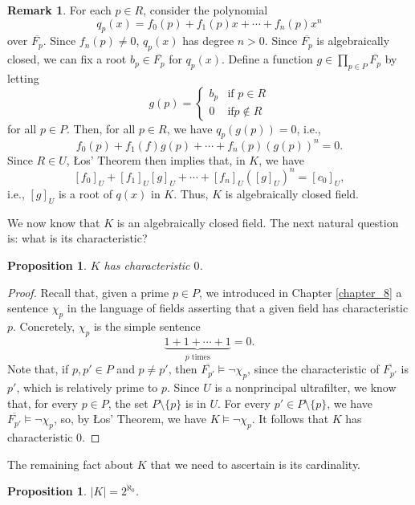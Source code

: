 \documentclass[a4paper]{memoir}
\newtheorem{proposition}[theorem]{Proposition}
\theoremstyle{definition}
\newtheorem{remark}[theorem]{Remark}
\begin{document}
\begin{remark}
  For each $p \in R$, consider the polynomial
  \[
    q_p(x) = f_0(p) + f_1(p) x + \cdots + f_n(p) x^n
  \]
  over $\overline{F_p}$. Since $f_n(p) \neq 0$, $q_p(x)$ has degree $n > 0$. Since 
  $\overline{F_p}$ is algebraically closed, we can fix a root $b_p \in \overline{F_p}$ 
  for $q_p(x)$. Define a function $g \in \prod_{p \in P} \overline{F_p}$ by letting 
  \[
    g(p) = \begin{cases}
      b_p & \text{if } p \in R \\
      0 & \text{if} p \notin R
    \end{cases}
  \]
  for all $p \in P$. Then, for all $p \in R$, we have $q_p(g(p)) = 0$, i.e.,
  \[
    f_0(p) + f_1(f) g(p) + \cdots + f_n(p) (g(p))^n = 0.
  \]
  Since $R \in U$, \L os' Theorem then implies that, in $K$, we have
  \[
    [f_0]_U + [f_1]_U [g]_U + \cdots + [f_n]_U ([g]_U)^n = [c_0]_U,
  \]
  i.e., $[g]_U$ is a root of $q(x)$ in $K$. Thus, $K$ is algebraically closed field.
\end{remark}

We now know that $K$ is an algebraically closed field. The next natural question is: what is 
its characteristic?

\begin{proposition}
  $K$ has characteristic $0$.
\end{proposition}

\begin{proof}
  Recall that, given a prime $p \in P$, we introduced in Chapter \ref{chapter_8} a 
  sentence $\chi_p$ in the language of fields asserting that a given field has 
  characteristic $p$. Concretely, $\chi_p$ is the simple sentence
  \[
    \underbrace{1 + 1 + \cdots + 1}_{\text{$p$ times}} = 0.
  \]
  Note that, if $p,p' \in P$ and $p \neq p'$, then $\overline{F_{p'}} \models 
  \neg \chi_p$, since the characteristic of $\overline{F_{p'}}$ is $p'$, which 
  is relatively prime to $p$. Since $U$ is a nonprincipal ultrafilter, we know that, 
  for every $p \in P$, the set $P \setminus \{p\}$ is in $U$. For every 
  $p' \in P \setminus \{p\}$, we have $\overline{F_{p'}} \models \neg \chi_p$, so, 
  by \L os' Theorem, we have $K \models \neg \chi_p$. It follows that $K$ has 
  characteristic $0$.
\end{proof}

The remaining fact about $K$ that we need to ascertain is its cardinality.

\begin{proposition}
  $|K| = 2^{\aleph_0}$.
\end{proposition}
\end{document}
